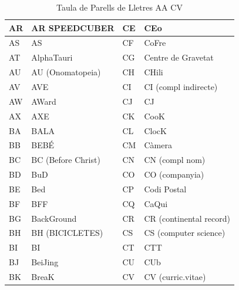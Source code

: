 \begin{table}[ht]
\begin{tabular}{|l|l|l|l|}
        AR & AR SPEEDCUBER      & CE & CEo                     \\ \hline
        AS & AS                 & CF & CoFre                   \\ \hline
        AT & AlphaTauri         & CG & Centre de Gravetat      \\ \hline
        AU & AU (Onomatopeia)   & CH & CHili                   \\ \hline
        AV & AVE                & CI & CI (compl indirecte)    \\ \hline
        AW & AWard              & CJ & CJ                      \\ \hline
        AX & AXE                & CK & CooK                    \\ \hline
        BA & BALA               & CL & ClocK                   \\ \hline
        BB & BEBÉ               & CM & Càmera                  \\ \hline
        BC & BC (Before Christ) & CN & CN (compl nom)          \\ \hline
        BD & BuD                & CO & CO (companyia)          \\ \hline
        BE & Bed                & CP & Codi Postal             \\ \hline
        BF & BFF                & CQ & CaQui                   \\ \hline
        BG & BackGround         & CR & CR (continental record) \\ \hline
        BH & BH (BICICLETES)    & CS & CS (computer science)   \\ \hline
        BI & BI                 & CT & CTT                     \\ \hline
        BJ & BeiJing            & CU & CUb                     \\ \hline
        BK & BreaK              & CV & CV (curric.vitae)       \\ \hline
    \end{tabular}
    \caption{Taula de Parells de Lletres AA \rightarrow CV}
    \label{tla:lletres-1}
\end{table}

